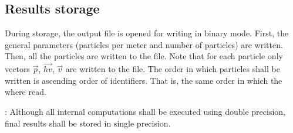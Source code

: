 \subsection{Results storage}

During storage, the output file is opened for writing in binary mode.  First,
the general parameters (particles per meter and number of particles) are
written. Then, all the particles are written to the file. Note that for each
particle only vectors $\vec{p}$, $\overrightarrow{hv}$, $\vec{v}$ are written
to the file.  The order in which particles shall be written is ascending order
of identifiers. That is, the same order in which the where read.

: Although all internal computations shall be executed
using double precision, final results shall be stored in single precision.
